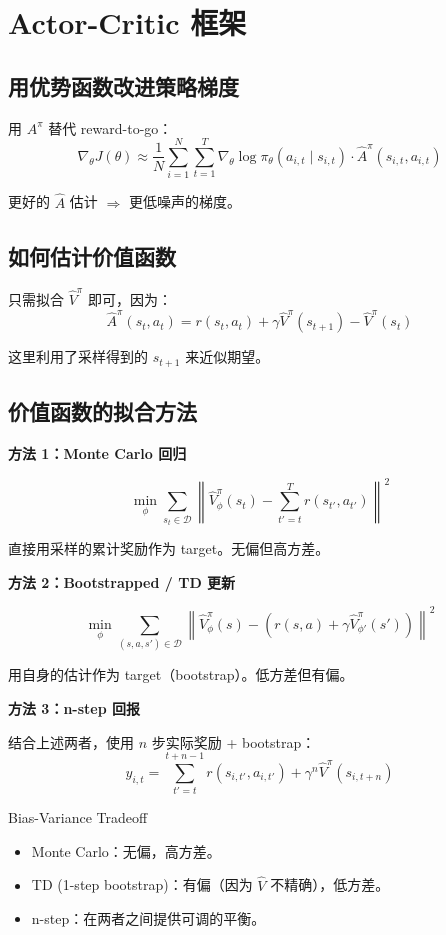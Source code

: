 \section{Actor-Critic 框架}

\subsection{用优势函数改进策略梯度}

用 $A^\pi$ 替代 reward-to-go：
$$\nabla_\theta J(\theta) \approx \frac{1}{N}\sum_{i=1}^{N}\sum_{t=1}^{T} \nabla_\theta \log \pi_\theta(a_{i,t} \mid s_{i,t}) \cdot \hat{A}^\pi(s_{i,t}, a_{i,t})$$

更好的 $\hat{A}$ 估计 $\Rightarrow$ 更低噪声的梯度。

\subsection{如何估计价值函数}

只需拟合 $\hat{V}^\pi$ 即可，因为：
$$\hat{A}^\pi(s_t, a_t) = r(s_t, a_t) + \gamma \hat{V}^\pi(s_{t+1}) - \hat{V}^\pi(s_t)$$

这里利用了采样得到的 $s_{t+1}$ 来近似期望。

\subsection{价值函数的拟合方法}

\textbf{方法 1：Monte Carlo 回归}

$$\min_\phi \sum_{s_t \in \mathcal{D}} \left\| \hat{V}^\pi_\phi(s_t) - \sum_{t'=t}^{T} r(s_{t'}, a_{t'}) \right\|^2$$

直接用采样的累计奖励作为 target。无偏但高方差。

\textbf{方法 2：Bootstrapped / TD 更新}

$$\min_\phi \sum_{(s,a,s') \in \mathcal{D}} \left\| \hat{V}^\pi_\phi(s) - \left(r(s,a) + \gamma \hat{V}^\pi_{\phi'}(s')\right) \right\|^2$$

用自身的估计作为 target（bootstrap）。低方差但有偏。

\textbf{方法 3：n-step 回报}

结合上述两者，使用 $n$ 步实际奖励 + bootstrap：
$$y_{i,t} = \sum_{t'=t}^{t+n-1} r(s_{i,t'}, a_{i,t'}) + \gamma^n \hat{V}^\pi(s_{i,t+n})$$

\begin{knowledgebox}{Bias-Variance Tradeoff}
\begin{itemize}
    \item Monte Carlo：无偏，高方差。
    \item TD (1-step bootstrap)：有偏（因为 $\hat{V}$ 不精确），低方差。
    \item n-step：在两者之间提供可调的平衡。
\end{itemize}
\end{knowledgebox}

